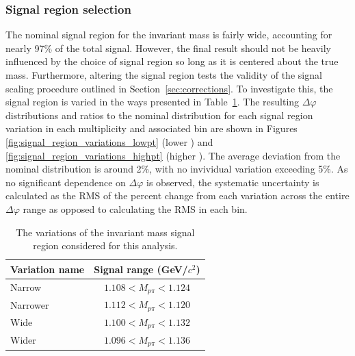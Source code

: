\subsubsection{Signal region selection}
The nominal signal region for the \lmb invariant mass is fairly wide, accounting for nearly 97\% of the total \lmb signal.  However, the final result should not be heavily influenced by the choice of signal region so long as it is centered about the true \lmb mass. Furthermore, altering the signal region tests the validity of the signal scaling procedure outlined in Section~\ref{sec:corrections}. To investigate this, the signal region is varied in the ways presented in Table~\ref{tab:signal_region_variations}. The resulting $\Delta\varphi$ distributions and ratios to the nominal distribution for each signal region variation in each multiplicity and associated \pt bin are shown in Figures \ref{fig:signal_region_variations_lowpt} (lower \pt) and \ref{fig:signal_region_variations_highpt} (higher \pt). The average deviation from the nominal distribution is around 2\%, with no invividual variation exceeding 5\%. As no significant dependence on $\Delta\varphi$ is observed, the systematic uncertainty is calculated as the RMS of the percent change from each variation across the entire $\Delta\varphi$ range as opposed to calculating the RMS in each bin.

\begin{table}[ht]
    \centering
    \caption{The variations of the \lmb invariant mass signal region considered for this analysis.}
    \label{tab:signal_region_variations}
    \begin{tabular}{l c}
        \hline
        Variation name & Signal range (GeV/$c^2$) \\
        \hline
        Narrow & $1.108 < M_{p\pi} < 1.124$ \\
        Narrower & $1.112 < M_{p\pi} < 1.120$ \\
        Wide & $1.100 < M_{p\pi} < 1.132$ \\
        Wider & $1.096 < M_{p\pi} < 1.136$ \\
        \hline
    \end{tabular}
\end{table}

